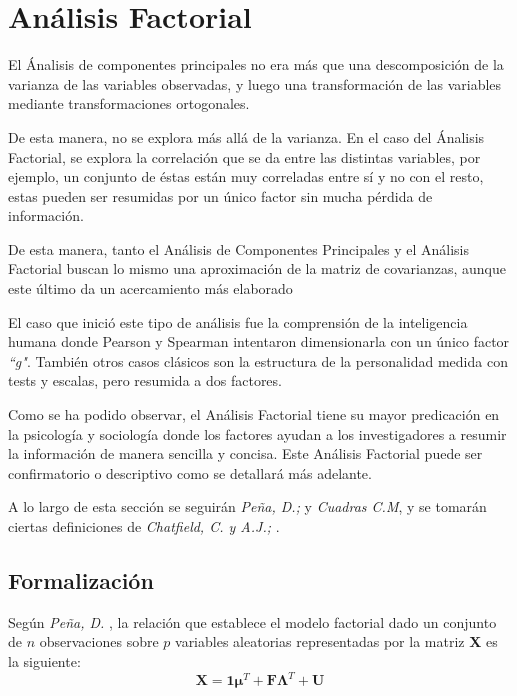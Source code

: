\newpage
\section{Análisis Factorial}

\noindent El Ánalisis de componentes principales no era más que una descomposición de la varianza de las variables observadas, y luego una transformación de las variables mediante transformaciones ortogonales. 

\noindent De esta manera, no se explora más allá de la varianza. En el caso del Ánalisis Factorial, se explora la correlación que se da entre las distintas variables, por ejemplo, un conjunto de éstas están muy correladas entre sí y no con el resto, estas pueden ser resumidas por un único factor sin mucha pérdida de información. 

\noindent De esta manera, tanto el Análisis de Componentes Principales y el Análisis Factorial buscan lo mismo una aproximación de la matriz de covarianzas, aunque este último da un acercamiento más elaborado 

\noindent El caso que inició este tipo de análisis fue la comprensión de la inteligencia humana donde Pearson y Spearman intentaron dimensionarla con un único factor \emph{``g"}. También otros casos clásicos son la estructura de la personalidad medida con tests y escalas, pero resumida a dos factores. 

\noindent Como se ha podido observar, el Análisis Factorial tiene su mayor predicación en la psicología y sociología donde los factores ayudan a los investigadores a resumir la información de manera sencilla y concisa. Este Análisis Factorial puede ser confirmatorio o descriptivo como se detallará más adelante. 

\noindent A lo largo de esta sección se seguirán \emph{Peña, D.;}\cite{Peña 2002} y \emph{Cuadras C.M}\cite{Cuadras 2014}, y  se tomarán ciertas definiciones de \emph{Chatfield, C. y A.J.;} \cite{Chatfield 1989}. 

\subsection{Formalización}
\noindent Según \emph{Peña, D.} \cite{Peña 2002}, la relación que establece el modelo factorial dado un conjunto de $n$ observaciones sobre $p$ variables aleatorias representadas por la matriz \textbf{X} es la siguiente:
\begin{equation}\label{Eq. Factorial}
\textbf{X}=\textbf{1}\mathbf{\mu}^T+\textbf{F}\mathbf{\Lambda}^T+\textbf{U}
\end{equation}

